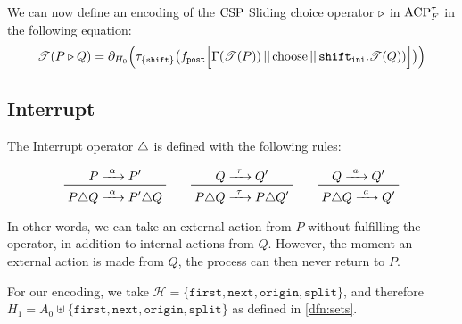 \documentclass[../hons_project.tex]{subfiles}
\begin{document}
We can now define an encoding of the $\mathrm{CSP}$ Sliding choice operator $\triangleright$ in $\mathrm{ACP}_{F}^{\tau}$ in the following equation:
\[\mathscr{T}(P \triangleright Q) = \partial_{H_{0}}\Bigl(\tau_{\{\mathtt{shift}\}}\bigl(f_{\mathtt{post}}\Bigl[ \Gamma(\mathscr{T}(P)) \,\vert\vert\, \mathrm{choose} \,\vert\vert\, \mathtt{shift}_{\mathtt{ini}} . \mathscr{T}(Q)) \Bigr]\bigr)\Bigr)\]


\subsection{Interrupt}\label{ssec:interrupt}

The Interrupt operator $\triangle$ is defined with the following rules:

\[\prftree{P \prightarrow{\alpha} P'}{P \interrupt Q \prightarrow{\alpha} P' \interrupt Q} \qquad \prftree{Q \prightarrow{\tau} Q'}{P \interrupt Q \prightarrow{\tau} P \interrupt Q'} \qquad \prftree{Q \prightarrow{a} Q'}{P \interrupt Q \prightarrow{a} Q'}\]

In other words, we can take an external action from $P$ without fulfilling the operator, in addition to internal actions from $Q$. However, the moment an external action is made from $Q$, the process can then never return to $P$.

For our encoding, we take $\mathscr{H} = \{\mathtt{first}, \mathtt{next}, \mathtt{origin}, \mathtt{split}\}$, and therefore $H_{1} = A_{0} \uplus \{\mathtt{first}, \mathtt{next}, \mathtt{origin}, \mathtt{split}\}$ as defined in \ref{dfn:sets}.
\end{document}
